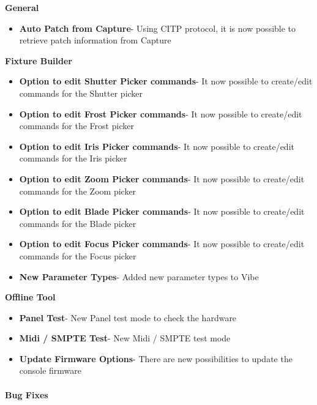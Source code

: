 \documentclass[
]{article}
\providecommand{\tightlist}{%
  \setlength{\itemsep}{0pt}\setlength{\parskip}{0pt}}
\begin{document}
\textbf{General}

\begin{itemize}
\tightlist
\item
  \textbf{Auto Patch from Capture}- Using CITP protocol, it is now possible to retrieve patch information from Capture
\end{itemize}

\textbf{Fixture Builder}

\begin{itemize}
\item
  \textbf{Option to edit Shutter Picker commands}- It now possible to create/edit commands for the Shutter picker
\item
  \textbf{Option to edit Frost Picker commands}- It now possible to create/edit commands for the Frost picker
\item
  \textbf{Option to edit Iris Picker commands}- It now possible to create/edit commands for the Iris picker
\item
  \textbf{Option to edit Zoom Picker commands}- It now possible to create/edit commands for the Zoom picker
\item
  \textbf{Option to edit Blade Picker commands}- It now possible to create/edit commands for the Blade picker
\item
  \textbf{Option to edit Focus Picker commands}- It now possible to create/edit commands for the Focus picker
\item
  \textbf{New Parameter Types}- Added new parameter types to Vibe
\end{itemize}

\textbf{Offline Tool}

\begin{itemize}
\item
  \textbf{Panel Test}- New Panel test mode to check the hardware
\item
  \textbf{Midi / SMPTE Test}- New Midi / SMPTE test mode
\item
  \textbf{Update Firmware Options}- There are new possibilities to update the console firmware
\end{itemize}

\hypertarget{bug-fixes}{%
\paragraph{Bug Fixes}\label{bug-fixes}}
\end{document}
